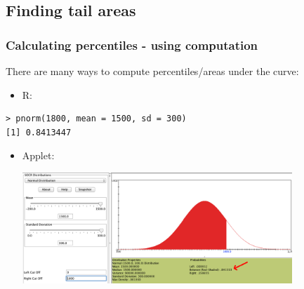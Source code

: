 
%
%
%
%
%
%

\subsection{Finding tail areas}


\begin{frame}[fragile]
\frametitle{Calculating percentiles - using computation}

There are many ways to compute percentiles/areas under the curve:

\begin{itemize}
\item R:
\end{itemize}
\begin{beamerboxesrounded}[shadow = false, lower = code body]{}
{\small \begin{verbatim}
> pnorm(1800, mean = 1500, sd = 300)
[1] 0.8413447
\end{verbatim}
}
\end{beamerboxesrounded}
\begin{itemize}
\item Applet: {\small {}}
\begin{center}
\includegraphics[width=0.8\textwidth]{4-1_normal_distribution/figures/applet}
\end{center}

\end{itemize}


\end{frame}

